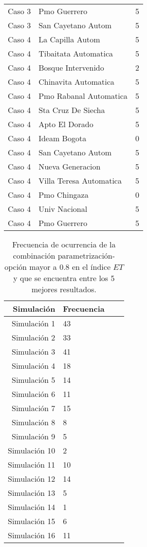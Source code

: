 \begin{longtable}{lll}
Caso 3 & Pmo Guerrero  & 5\\
Caso 3 & San Cayetano Autom   & 5\\
Caso 4 & La Capilla Autom  & 5\\
Caso 4 & Tibaitata Automatica  & 5\\
Caso 4 & Bosque Intervenido    & 2\\
Caso 4 & Chinavita Automatica  & 5\\
Caso 4 & Pmo Rabanal Automatica   & 5\\
Caso 4 & Sta Cruz De Siecha  & 5\\
Caso 4 & Apto El Dorado  & 5\\
Caso 4 & Ideam Bogota  & 0\\
Caso 4 & San Cayetano Autom   & 5\\
Caso 4 & Nueva Generacion  & 5\\
Caso 4 & Villa Teresa Automatica  & 5\\
Caso 4 & Pmo Chingaza  & 0\\
Caso 4 & Univ Nacional  & 5\\
Caso 4 & Pmo Guerrero  & 5\\


\end{longtable}






\begin{table}
    \centering
    \caption{Frecuencia de ocurrencia de la combinación parametrización-opción mayor a 0.8 en el índice $ET$ y que se encuentra entre los 5 mejores resultados.}
    \label{tabla:resultado_tiempo}
\begin{tabular}{rlrr}
\toprule
 Simulación &  Frecuencia \\
\midrule
Simulación 1  &     43 \\
Simulación 2  &     33 \\
Simulación 3  &     41 \\
Simulación 4  &     18 \\
Simulación 5  &     14 \\
Simulación 6  &     11 \\
Simulación 7  &     15 \\
Simulación 8  &      8 \\
Simulación 9  &      5 \\
Simulación 10 &      2 \\
Simulación 11 &     10 \\
Simulación 12 &     14 \\
Simulación 13 &      5 \\
Simulación 14 &      1 \\
Simulación 15 &      6 \\
Simulación 16 &     11 \\
\bottomrule
\end{tabular}
\end{table}

